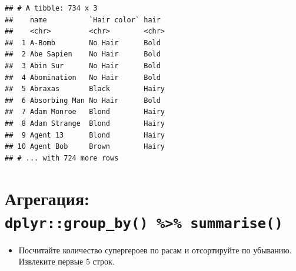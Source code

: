 \documentclass[]{book}
\newenvironment{Shaded}{\begin{snugshade}}{\end{snugshade}}
\newcommand{\KeywordTok}[1]{\textcolor[rgb]{0.13,0.29,0.53}{\textbf{#1}}}
\newcommand{\DataTypeTok}[1]{\textcolor[rgb]{0.13,0.29,0.53}{#1}}
\newcommand{\DecValTok}[1]{\textcolor[rgb]{0.00,0.00,0.81}{#1}}
\newcommand{\StringTok}[1]{\textcolor[rgb]{0.31,0.60,0.02}{#1}}
\newcommand{\OtherTok}[1]{\textcolor[rgb]{0.56,0.35,0.01}{#1}}
\newcommand{\OperatorTok}[1]{\textcolor[rgb]{0.81,0.36,0.00}{\textbf{#1}}}
\newcommand{\NormalTok}[1]{#1}
\providecommand{\tightlist}{%
  \setlength{\itemsep}{0pt}\setlength{\parskip}{0pt}}
\begin{document}
\begin{Shaded}
\end{Shaded}

\begin{verbatim}
## # A tibble: 734 x 3
##    name          `Hair color` hair 
##    <chr>         <chr>        <chr>
##  1 A-Bomb        No Hair      Bold 
##  2 Abe Sapien    No Hair      Bold 
##  3 Abin Sur      No Hair      Bold 
##  4 Abomination   No Hair      Bold 
##  5 Abraxas       Black        Hairy
##  6 Absorbing Man No Hair      Bold 
##  7 Adam Monroe   Blond        Hairy
##  8 Adam Strange  Blond        Hairy
##  9 Agent 13      Blond        Hairy
## 10 Agent Bob     Brown        Hairy
## # ... with 724 more rows
\end{verbatim}

\section{\texorpdfstring{Агрегация:
\texttt{dplyr::group\_by()\ \%\textgreater{}\%\ summarise()}}{Агрегация: dplyr::group\_by() \%\textgreater{}\% summarise()}}\label{solution_group_by}

\begin{itemize}
\tightlist
\item
  Посчитайте количество супергероев по расам и отсортируйте по убыванию.
  Извлеките первые 5 строк.
\end{itemize}

\begin{Shaded}
\end{Shaded}
\end{document}

